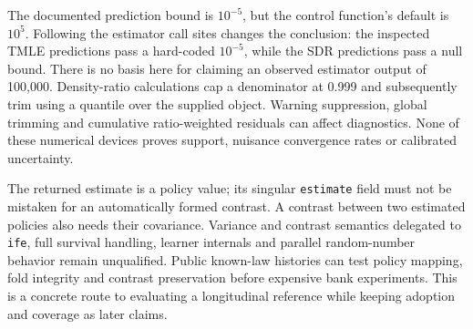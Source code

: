 The documented prediction bound is $10^{-5}$, but the control function's
default is $10^5$. Following the estimator call sites changes the conclusion:
the inspected TMLE predictions pass a hard-coded $10^{-5}$, while the SDR
predictions pass a null bound. There is no basis here for claiming an observed
estimator output of 100,000. Density-ratio calculations cap a denominator at
0.999 and subsequently trim using a quantile over the supplied object.
Warning suppression, global trimming and cumulative ratio-weighted residuals
can affect diagnostics. None of these numerical devices proves support,
nuisance convergence rates or calibrated uncertainty.
\citep{exec22_lmtp_reuse}

The returned estimate is a policy value; its singular \texttt{estimate} field
must not be mistaken for an automatically formed contrast. A contrast between
two estimated policies also needs their covariance. Variance and contrast
semantics delegated to \texttt{ife}, full survival handling, learner internals
and parallel random-number behavior remain unqualified. Public known-law
histories can test policy mapping, fold integrity and contrast preservation
before expensive bank experiments. This is a concrete route to evaluating a
longitudinal reference while keeping adoption and coverage as later claims.
